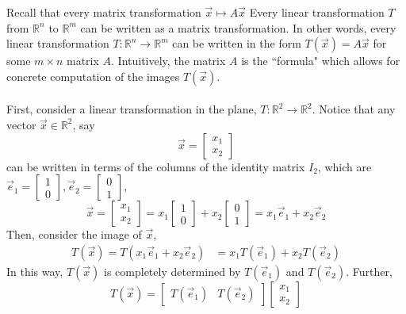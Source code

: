 \documentclass[letterpaper,12pt]{article}
\begin{document}
Recall that every matrix transformation $\vec{x} \mapsto A\vec{x}$
Every linear transformation $T$ from $\mathbb{R}^n$ to $\mathbb{R}^m$ can be written as a matrix transformation. In other words, every linear transformation $T: \mathbb{R}^n \rightarrow \mathbb{R}^m$ can be written in the form $T(\vec{x}) = A\vec{x}$ for some $m \times n$ matrix $A$. Intuitively, the matrix $A$ is the ``formula" which allows for concrete computation of the images $T(\vec{x})$.
\\ \\ First, consider a linear transformation in the plane, $T: \mathbb{R}^2 \rightarrow \mathbb{R}^2$. Notice that any vector $\vec{x} \in \mathbb{R}^2$, say
\begin{equation*}
    \vec{x} = \begin{bmatrix} x_1 \\ x_2 \end{bmatrix}
\end{equation*}
can be written in terms of the columns of the identity matrix $I_2$, which are $\vec{e}_1 = \begin{bmatrix} 1 \\ 0 \end{bmatrix}, \vec{e}_2 = \begin{bmatrix} 0 \\ 1 \end{bmatrix}$,
\begin{equation*}
    \vec{x} = \begin{bmatrix} x_1 \\ x_2 \end{bmatrix} = x_1 \begin{bmatrix} 1 \\ 0 \end{bmatrix} + x_2 \begin{bmatrix} 0 \\ 1 \end{bmatrix} = x_1 \vec{e}_1 + x_2 \vec{e}_2
\end{equation*}
Then, consider the image of $\vec{x}$,
\begin{align*}
    T(\vec{x}) = T(x_1 \vec{e}_1 + x_2 \vec{e}_2) & = x_1 T(\vec{e}_1) + x_2 T(\vec{e}_2)
\end{align*}
In this way, $T(\vec{x})$ is completely determined by $T(\vec{e}_1)$ and $T(\vec{e}_2)$. Further,
\begin{equation*}
    T(\vec{x}) = \begin{bmatrix} T(\vec{e}_1) & T(\vec{e}_2) \end{bmatrix} \begin{bmatrix} x_1 \\ x_2 \end{bmatrix}
\end{equation*}
\end{document}
